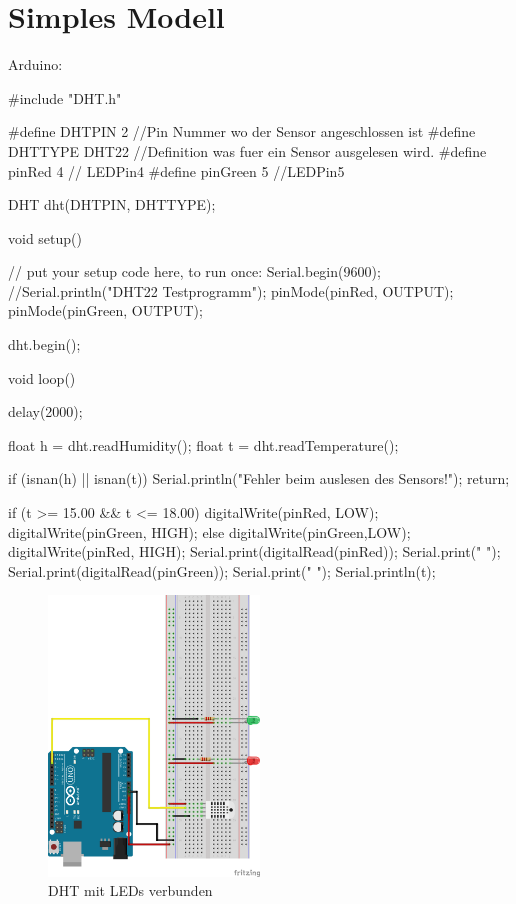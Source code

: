 \documentclass[12pt]{article}
\begin{document}
\section{Simples Modell}
Arduino:
\begin{code}
#include "DHT.h"

#define DHTPIN 2 //Pin Nummer wo der Sensor angeschlossen ist
#define DHTTYPE DHT22 //Definition was fuer ein Sensor ausgelesen wird.
#define pinRed 4 // LEDPin4
#define pinGreen 5 //LEDPin5

DHT dht(DHTPIN, DHTTYPE);

void setup() {
  // put your setup code here, to run once:
  Serial.begin(9600);
  //Serial.println("DHT22 Testprogramm");
  pinMode(pinRed, OUTPUT);
  pinMode(pinGreen, OUTPUT);

  dht.begin();

}

void loop() {
  delay(2000);

  float h = dht.readHumidity();
  float t = dht.readTemperature();

  if (isnan(h) || isnan(t)) {
    Serial.println("Fehler beim auslesen des Sensors!");
    return;
  }

  if (t >= 15.00 && t <= 18.00) {
    digitalWrite(pinRed, LOW);
    digitalWrite(pinGreen, HIGH);
  }
  else  {
    digitalWrite(pinGreen,LOW);
    digitalWrite(pinRed, HIGH);    
  }   
   Serial.print(digitalRead(pinRed));
   Serial.print(" ");
   Serial.print(digitalRead(pinGreen));
   Serial.print(" ");
   Serial.println(t);
}
\end{code}
\begin{figure}[H]
\begin{center}
\includegraphics[width=0.5\textwidth]{pics/dhtled.png}
\caption{DHT mit LEDs verbunden}
\end{center}
\end{figure}
\end{document}
